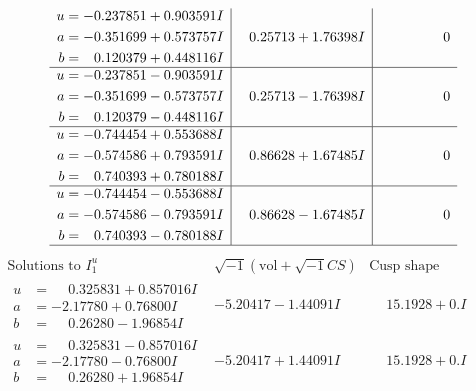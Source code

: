 \documentclass[1p]{elsarticle_modified}
\theoremstyle{definition}
\newcommand{\I}{\sqrt{-1}}
\begin{document}
$$\begin{array}{c|c|c}
\begin{aligned}
u &= -0.237851 + 0.903591 I \\
a &= -0.351699 + 0.573757 I \\
b &= \phantom{-}0.120379 + 0.448116 I\end{aligned}
 & \phantom{-}0.25713 + 1.76398 I & \phantom{-0.000000 } 0 \\ \hline\begin{aligned}
u &= -0.237851 - 0.903591 I \\
a &= -0.351699 - 0.573757 I \\
b &= \phantom{-}0.120379 - 0.448116 I\end{aligned}
 & \phantom{-}0.25713 - 1.76398 I & \phantom{-0.000000 } 0 \\ \hline\begin{aligned}
u &= -0.744454 + 0.553688 I \\
a &= -0.574586 + 0.793591 I \\
b &= \phantom{-}0.740393 + 0.780188 I\end{aligned}
 & \phantom{-}0.86628 + 1.67485 I & \phantom{-0.000000 } 0 \\ \hline\begin{aligned}
u &= -0.744454 - 0.553688 I \\
a &= -0.574586 - 0.793591 I \\
b &= \phantom{-}0.740393 - 0.780188 I\end{aligned}
 & \phantom{-}0.86628 - 1.67485 I & \phantom{-0.000000 } 0\\
 \hline 
 \end{array}$$\newpage$$\begin{array}{c|c|c}  
\text{Solutions to }I^u_{1}& \I (\text{vol} + \sqrt{-1}CS) & \text{Cusp shape}\\
 \hline 
\begin{aligned}
u &= \phantom{-}0.325831 + 0.857016 I \\
a &= -2.17780 + 0.76800 I \\
b &= \phantom{-}0.26280 - 1.96854 I\end{aligned}
 & -5.20417 - 1.44091 I & \phantom{-}15.1928 + 0. I\phantom{ +0.000000I} \\ \hline\begin{aligned}
u &= \phantom{-}0.325831 - 0.857016 I \\
a &= -2.17780 - 0.76800 I \\
b &= \phantom{-}0.26280 + 1.96854 I\end{aligned}
 & -5.20417 + 1.44091 I & \phantom{-}15.1928 + 0. I\phantom{ +0.000000I} \\ \hline\begin{aligned}

\end{aligned}
\end{array}$$
\end{document}
